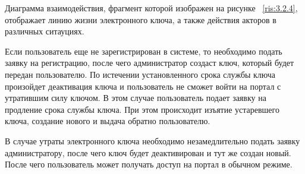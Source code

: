Диаграмма взаимодействия, фрагмент которой изображен на рисунке
~\ref{ris:3.2.4}, отображает линию жизни электронного ключа, а также действия
акторов в различных ситауциях.

Если пользователь еще не зарегистрирован в системе, то необходимо подать заявку
на регистрацию, после чего администратор создаст ключ, который будет передан
пользователю. По истечении установленного срока службы ключа произойдет
деактивация ключа и пользователь не сможет войти на портал с утратившим силу
ключом. В этом случае пользователь подает заявку на продление срока службы
ключа. При этом происходит изъятие устаревшего ключа, создание нового и выдача
обратно пользователю.

В случае утраты электронного ключа необходимо незамедлительно подать заявку
администратору, после чего ключ будет деактивирован и тут же создан новый. После
чего пользователь может получать доступ на портал в обычном режиме.